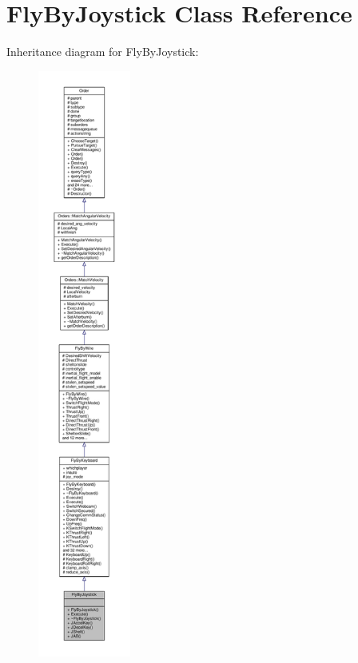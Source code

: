 \hypertarget{classFlyByJoystick}{}\section{Fly\+By\+Joystick Class Reference}
\label{classFlyByJoystick}


Inheritance diagram for Fly\+By\+Joystick\+:
\nopagebreak
\begin{figure}[H]
\begin{center}
\leavevmode
\includegraphics[height=550pt]{d0/d73/classFlyByJoystick__inherit__graph}
\end{center}
\end{figure}


